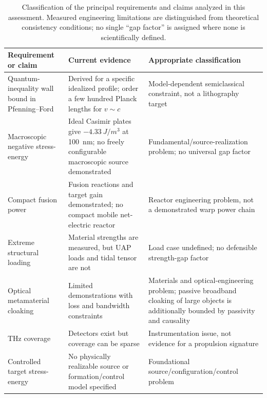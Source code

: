 \documentclass[aps,prd,twocolumn,superscriptaddress,nofootinbib,floatfix]{revtex4-2}
\begin{document}
\begin{table}[t]
\caption{Classification of the principal requirements and claims analyzed in this
assessment. Measured engineering limitations are distinguished from theoretical
consistency conditions; no single ``gap factor'' is assigned where none is
scientifically defined.}
\label{tab:materials-gap}
\begin{tabular}{@{}lll@{}}
\toprule
\parbox[t]{0.25\textwidth}{\strut Requirement or claim\strut} & \parbox[t]{0.36\textwidth}{\strut Current evidence\strut} & \parbox[t]{0.31\textwidth}{\strut Appropriate classification\strut} \\
\midrule
\parbox[t]{0.25\textwidth}{\strut Quantum-inequality wall bound in Pfenning--Ford\strut} & \parbox[t]{0.36\textwidth}{\strut Derived for a specific idealized
  profile; order a few hundred Planck lengths for $v\sim c$\strut} & \parbox[t]{0.31\textwidth}{\strut Model-dependent
  semiclassical constraint, not a lithography target\strut} \\
\parbox[t]{0.25\textwidth}{\strut Macroscopic negative stress-energy\strut} & \parbox[t]{0.36\textwidth}{\strut Ideal Casimir plates give
  $-\SI{4.33}{J/m^{3}}$ at \SI{100}{nm}; no freely configurable macroscopic source
  demonstrated\strut} & \parbox[t]{0.31\textwidth}{\strut Fundamental/source-realization problem; no universal gap factor\strut} \\
\parbox[t]{0.25\textwidth}{\strut Compact fusion power\strut} & \parbox[t]{0.36\textwidth}{\strut Fusion reactions and target gain demonstrated; no compact
  mobile net-electric reactor\strut} & \parbox[t]{0.31\textwidth}{\strut Reactor engineering problem, not a demonstrated
  warp power chain\strut} \\
\parbox[t]{0.25\textwidth}{\strut Extreme structural loading\strut} & \parbox[t]{0.36\textwidth}{\strut Material strengths are measured, but UAP loads and
  tidal tensor are not\strut} & \parbox[t]{0.31\textwidth}{\strut Load case undefined; no defensible strength-gap factor\strut} \\
\parbox[t]{0.25\textwidth}{\strut Optical metamaterial cloaking\strut} & \parbox[t]{0.36\textwidth}{\strut Limited demonstrations with loss and bandwidth
  constraints\strut} & \parbox[t]{0.31\textwidth}{\strut Materials and optical-engineering problem; passive broadband
  cloaking of large objects is additionally bounded by passivity and causality\strut} \\
\parbox[t]{0.25\textwidth}{\strut THz coverage\strut} & \parbox[t]{0.36\textwidth}{\strut Detectors exist but coverage can be sparse\strut} & \parbox[t]{0.31\textwidth}{\strut Instrumentation issue,
  not evidence for a propulsion signature\strut} \\
\parbox[t]{0.25\textwidth}{\strut Controlled target stress-energy\strut} & \parbox[t]{0.36\textwidth}{\strut No physically realizable source or
  formation/control model specified\strut} & \parbox[t]{0.31\textwidth}{\strut Foundational source/configuration/control
  problem\strut} \\
\bottomrule
\end{tabular}
\end{table}
\end{document}
